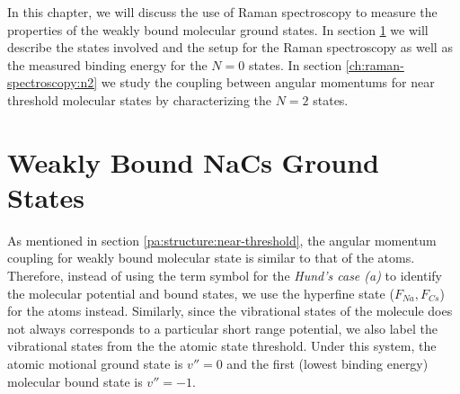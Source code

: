 In this chapter, we will discuss the use of Raman spectroscopy
to measure the properties of the weakly bound molecular ground states.
In section \ref{ch:raman-spectroscopy:states}
we will describe the states involved and the setup for the Raman spectroscopy
as well as the measured binding energy for the $N=0$ states.
In section \ref{ch:raman-spectroscopy:n2}
we study the coupling between angular momentums for near threshold molecular states
by characterizing the $N=2$ states.

\section{Weakly Bound NaCs Ground States}
\label{ch:raman-spectroscopy:states}

As mentioned in section \ref{pa:structure:near-threshold},
the angular momentum coupling for weakly bound molecular state is similar to that of the atoms.
Therefore, instead of using the term symbol for the \textit{Hund's case (a)}
to identify the molecular potential and bound states,
we use the hyperfine state ($F_{Na}, F_{Cs}$) for the atoms instead.
Similarly, since the vibrational states of the molecule does not always corresponds to
a particular short range potential, we also label the vibrational states
from the the atomic state threshold.
Under this system, the atomic motional ground state is $v''=0$ and
the first (lowest binding energy) molecular bound state is $v''=-1$.

